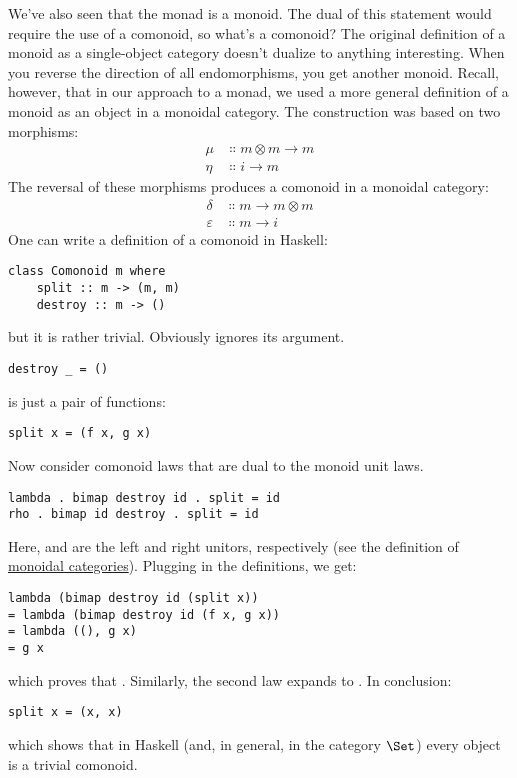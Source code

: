 We've also seen that the monad is a monoid. The dual of this statement
would require the use of a comonoid, so what's a comonoid? The original
definition of a monoid as a single-object category doesn't dualize to
anything interesting. When you reverse the direction of all
endomorphisms, you get another monoid. Recall, however, that in our
approach to a monad, we used a more general definition of a monoid as an
object in a monoidal category. The construction was based on two
morphisms:
\begin{align*}
\mu &\Colon m \otimes m \to m \\
\eta &\Colon i \to m
\end{align*}
The reversal of these morphisms produces a comonoid in a monoidal
category:
\begin{align*}
\delta &\Colon m \to m \otimes m \\
\varepsilon &\Colon m \to i
\end{align*}
One can write a definition of a comonoid in Haskell:

\begin{Verbatim}
class Comonoid m where
    split :: m -> (m, m)
    destroy :: m -> ()
\end{Verbatim}
but it is rather trivial. Obviously  ignores its
argument.

\begin{Verbatim}
destroy _ = ()
\end{Verbatim}
 is just a pair of functions:

\begin{Verbatim}
split x = (f x, g x)
\end{Verbatim}
Now consider comonoid laws that are dual to the monoid unit laws.

\begin{Verbatim}
lambda . bimap destroy id . split = id
rho . bimap id destroy . split = id
\end{Verbatim}
Here,  and  are the left and right unitors,
respectively (see the definition of
\hyperref[monads-categorically]{monoidal
categories}). Plugging in the definitions, we get:

\begin{Verbatim}
lambda (bimap destroy id (split x))
= lambda (bimap destroy id (f x, g x))
= lambda ((), g x)
= g x
\end{Verbatim}
which proves that . Similarly, the second law expands
to . In conclusion:

\begin{Verbatim}
split x = (x, x)
\end{Verbatim}
which shows that in Haskell (and, in general, in the category
$\Set$) every object is a trivial comonoid.

